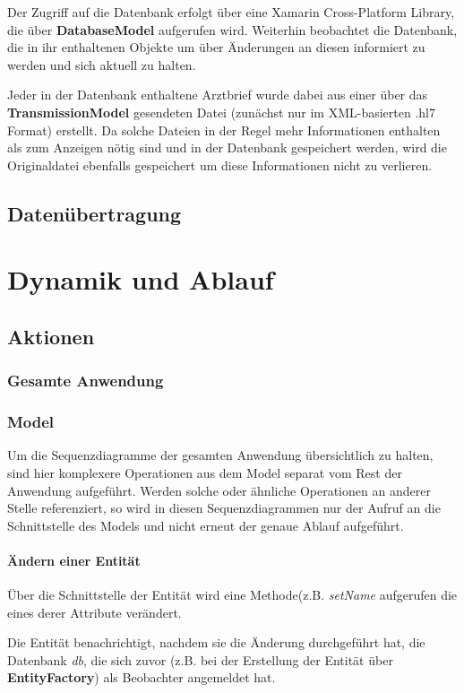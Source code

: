 \documentclass[a4paper]{scrreprt}
\begin{document}
Der Zugriff auf die Datenbank erfolgt über eine Xamarin Cross-Platform Library, die über \textbf{DatabaseModel} aufgerufen wird. Weiterhin beobachtet die Datenbank, die in ihr enthaltenen Objekte um über Änderungen an diesen informiert zu werden und sich aktuell zu halten.

Jeder in der Datenbank enthaltene Arztbrief wurde dabei aus einer über das \textbf{TransmissionModel}
gesendeten Datei (zunächst nur im XML-basierten .hl7 Format) erstellt. Da solche Dateien in der Regel mehr Informationen enthalten als zum Anzeigen nötig sind und in der Datenbank gespeichert werden, wird die Originaldatei ebenfalls gespeichert um diese Informationen nicht zu verlieren.

\section{Datenübertragung}

\chapter{Dynamik und Ablauf}
\section{Aktionen}
\subsection{Gesamte Anwendung}

\subsection{Model}
Um die Sequenzdiagramme der gesamten Anwendung übersichtlich zu halten, sind hier komplexere Operationen aus dem Model separat vom Rest der Anwendung aufgeführt. Werden solche oder ähnliche Operationen an anderer Stelle referenziert, so wird in diesen Sequenzdiagrammen nur der Aufruf an die Schnittstelle des Models und nicht erneut der genaue Ablauf aufgeführt.
 
\subsubsection{Ändern einer Entität}
Über die Schnittstelle der Entität wird eine Methode(z.B. \textit{setName} aufgerufen die eines derer Attribute verändert.

Die Entität benachrichtigt, nachdem sie die Änderung durchgeführt hat, die Datenbank \textit{db}, die sich zuvor (z.B. bei der Erstellung der Entität über \textbf{EntityFactory}) als Beobachter angemeldet hat.
\end{document}
